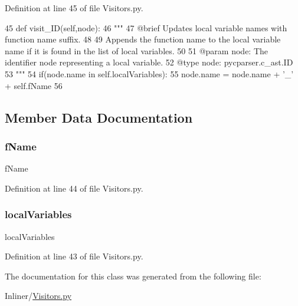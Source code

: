 Definition at line 45 of file Visitors.\+py.


\begin{DoxyCode}
45     \textcolor{keyword}{def }visit\_ID(self,node):
46         \textcolor{stringliteral}{"""
}
47 \textcolor{stringliteral}{        @brief Updates local variable names with function name suffix.
}
48 \textcolor{stringliteral}{
}
49 \textcolor{stringliteral}{        Appends the function name to the local variable name if it is found in the list of local
       variables.
}
50 \textcolor{stringliteral}{
}
51 \textcolor{stringliteral}{        @param node: The identifier node representing a local variable.
}
52 \textcolor{stringliteral}{        @type node: pycparser.c\_ast.ID
}
53 \textcolor{stringliteral}{        """}
54         if(node.name \textcolor{keywordflow}{in} self.localVariables):
55             node.name = node.name + \textcolor{stringliteral}{'\_'} + self.fName
56 
\end{DoxyCode}


\subsection{Member Data Documentation}
\mbox{\label{classVisitors_1_1LocalVariablesModifier_a5a5ccf2ed83be1d582eba6e7797690a5}} 
\subsubsection{\texorpdfstring{f\+Name}{fName}}
{\footnotesize\ttfamily f\+Name}



Definition at line 44 of file Visitors.\+py.

\mbox{\label{classVisitors_1_1LocalVariablesModifier_af117185a96147e67251924514b93a25e}} 
\subsubsection{\texorpdfstring{local\+Variables}{localVariables}}
{\footnotesize\ttfamily local\+Variables}



Definition at line 43 of file Visitors.\+py.



The documentation for this class was generated from the following file\+:\begin{DoxyCompactItemize}
\item 
Inliner/\hyperlink{Visitors_8py}{Visitors.\+py}\end{DoxyCompactItemize}
